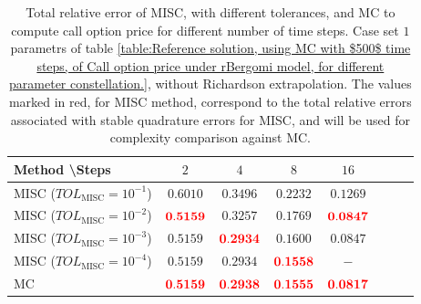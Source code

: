 \begin{table}[h!]
	\centering
	\begin{tabular}{l*{6}{c}r}
		Method \textbackslash  Steps            & $2$ & $4$ & $8$ & $16$  \\
		\hline
		MISC ($TOL_{\text{MISC}}=10^{-1}$)  & $\mathbf{0.6010}$ & $\mathbf{0.3496}$ & $\mathbf{  0.2232}$ & $\mathbf{
			0.1269}$  \\
		MISC ($TOL_{\text{MISC}}=10^{-2}$)  & $\mathbf{{\color{red}0.5159}}$ & $\mathbf{0.3257}$ & $\mathbf{ 0.1769}$ & $\mathbf{  {\color{red}0.0847}}$  \\
		MISC ($TOL_{\text{MISC}}=10^{-3}$)  & $\mathbf{0.5159}$ & $\mathbf{{\color{red}0.2934}}$ & $\mathbf{0.1600}$ & $\mathbf{0.0847}$  \\
		MISC ($TOL_{\text{MISC}}=10^{-4}$)  & $\mathbf{0.5159}$ & $\mathbf{0.2934}$ & $\mathbf{{\color{red}0.1558}}$ & $\mathbf{-}$  \\
		\hline
		MC     & $\mathbf{{\color{red}0.5159}}$ & $\mathbf{{\color{red}0.2938}}$ & $\mathbf{{\color{red}0.1555}}$ &$\mathbf{  {\color{red}0.0817}}$  \\	
		
		\hline
	\end{tabular}
	\caption{Total relative error of MISC, with different tolerances,  and MC to compute call option price for different number of time steps. Case  set $1$ parametrs of table \ref{table:Reference solution, using MC with $500$ time steps, of Call option price under rBergomi model, for different parameter constellation.}, without Richardson extrapolation. The values marked in red, for MISC method, correspond to the total relative errors associated with  stable quadrature errors for MISC, and will be used for complexity comparison against MC.}
	\label{Total error of MISC and MC to compute Call option price of the different tolerances for different number of time steps. Case set 1, without Richardson extrapolation. The numbers between parentheses are the corresponding absolute errors.}
\end{table}



